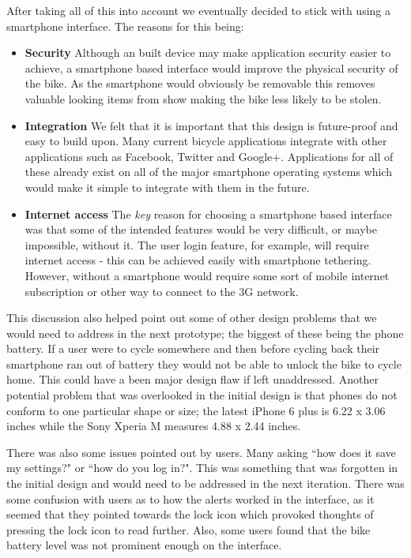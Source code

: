 \documentclass[a4paper]{report}
\begin{document}
After taking all of this into account we eventually decided to stick with using a smartphone interface. The reasons for this being:
\begin{itemize}
  \item \textbf{Security} Although an built device may make application security easier to achieve, a smartphone based interface would improve the physical security of the bike. As the smartphone would obviously be removable this removes valuable looking items from show making the bike less likely to be stolen.
  \item \textbf{Integration} We felt that it is important that this design is future-proof and easy to build upon. Many current bicycle applications integrate with other applications such as Facebook, Twitter and Google+. Applications for all of these already exist on all of the major smartphone operating systems which would make it simple to integrate with them in the future.
  \item \textbf{Internet access} The \textit{key} reason for choosing a smartphone based interface was that some of the intended features would be very difficult, or maybe impossible, without it. The user login feature, for example, will require internet access - this can be achieved easily with smartphone tethering. However, without a smartphone would require some sort of mobile internet subscription or other way to connect to the 3G network.
\end{itemize}
This discussion also helped point out some of other design problems that we would need to address in the next prototype; the biggest of these being the phone battery. If a user were to cycle somewhere and then before cycling back their smartphone ran out of battery they would not be able to unlock the bike to cycle home. This could have a been major design flaw if left unaddressed. Another potential problem that was overlooked in the initial design is that phones do not conform to one particular shape or size; the latest iPhone 6 plus is 6.22 x 3.06 inches while the Sony Xperia M measures 4.88 x 2.44 inches.

There was also some issues pointed out by users. Many asking ``how does it save my settings?" or ``how do you log in?". This was something that was forgotten in the initial design and would need to be addressed in the next iteration. There was some confusion with users as to how the alerts worked in the interface, as it seemed that they pointed towards the lock icon which provoked thoughts of pressing the lock icon to read further. Also, some users found that the bike battery level was not prominent enough on the interface. 
\end{document}
